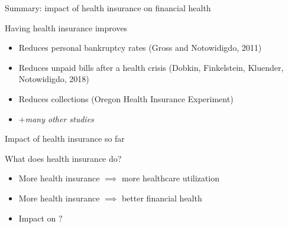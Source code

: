 
\begin{frame}{Summary: impact of health insurance on financial health}
    
    Having health insurance improves 
    \begin{itemize}
        \item Reduces personal bankruptcy rates (Gross and Notowidigdo, 2011)
        \item Reduces unpaid bills after a health crisis (Dobkin, Finkelstein, Kluender, Notowidigdo, 2018)
        \item Reduces collections (Oregon Health Insurance Experiment)
        \item[] +\textit{many other studies}
    \end{itemize}
    \vspace{3mm}


\end{frame}
\begin{frame}{Impact of health insurance so far}
    
    
What does health insurance do?
\begin{itemize}
    \item More health insurance $\implies$ more healthcare utilization
    \item More health insurance $\implies$ better financial health
    \item Impact on ?
\end{itemize}

\end{frame}
